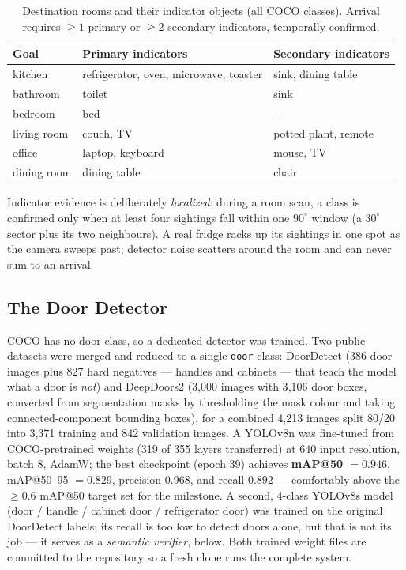 \begin{table}[H]
\centering
\caption[Destination rooms and indicator objects]{Destination rooms and their
indicator objects (all COCO classes). Arrival requires ${\geq}1$ primary or
${\geq}2$ secondary indicators, temporally confirmed.}
\label{tab:goal_indicators}
\small
\begin{tabular}{p{2.4cm} p{6.0cm} p{4.2cm}}
\toprule
\textbf{Goal} & \textbf{Primary indicators} & \textbf{Secondary indicators} \\
\midrule
kitchen      & refrigerator, oven, microwave, toaster & sink, dining table \\
bathroom     & toilet                                  & sink \\
bedroom      & bed                                     & --- \\
living room  & couch, TV                               & potted plant, remote \\
office       & laptop, keyboard                        & mouse, TV \\
dining room  & dining table                            & chair \\
\bottomrule
\end{tabular}
\end{table}

Indicator evidence is deliberately \emph{localized}: during a room scan, a class is
confirmed only when at least four sightings fall within one $90^\circ$ window (a
$30^\circ$ sector plus its two neighbours). A real fridge racks up its sightings in
one spot as the camera sweeps past; detector noise scatters around the room and can
never sum to an arrival.

\subsection{The Door Detector}
\label{sec:door_model}

COCO has no door class, so a dedicated detector was trained. Two public datasets
were merged and reduced to a single \texttt{door} class: DoorDetect
\cite{arduengo2021door} (386 door images plus 827 hard negatives --- handles and
cabinets --- that teach the model what a door is \emph{not}) and DeepDoors2
\cite{ramoa2021deepdoors} (3{,}000 images with 3{,}106 door boxes, converted from
segmentation masks by thresholding the mask colour and taking connected-component
bounding boxes), for a combined 4{,}213 images split 80/20 into 3{,}371 training
and 842 validation images. A YOLOv8n was fine-tuned from COCO-pretrained weights
(319 of 355 layers transferred) at $640$ input resolution, batch 8, AdamW; the best
checkpoint (epoch 39) achieves \textbf{mAP@50 $= 0.946$}, mAP@50--95 $= 0.829$,
precision $0.968$, and recall $0.892$ --- comfortably above the ${\geq}0.6$ mAP@50
target set for the milestone. A second, 4-class YOLOv8s model (door / handle /
cabinet door / refrigerator door) was trained on the original DoorDetect labels;
its recall is too low to detect doors alone, but that is not its job --- it serves
as a \emph{semantic verifier}, below. Both trained weight files are committed to
the repository so a fresh clone runs the complete system.

